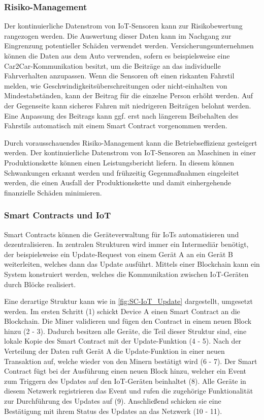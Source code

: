 \subsubsection{Risiko-Management}
\label{sec:Risk_Management}
Der kontinuierliche Datenstrom von IoT-Sensoren kann zur Risikobewertung rangezogen werden.
Die Auswertung dieser Daten kann im Nachgang zur Eingrenzung potentieller Schäden 
verwendet werden.
Versicherungsunternehmen können die Daten aus dem Auto verwenden, sofern es beispielsweise
eine Car2Car-Kommunikation besitzt, um die Beiträge an das individuelle Fahrverhalten
anzupassen. 
Wenn die Sensoren oft einen riskanten Fahrstil melden, wie Geschwindigkeitsüberschreitungen oder 
nicht-einhalten von Mindestabständen, kann der Beitrag für die einzelne Person erhöht werden. Auf der 
Gegenseite kann sicheres Fahren mit niedrigeren Beiträgen belohnt werden.
\cite[p.~169f]{chowdhary2025smart}
Eine Anpassung des Beitrags kann ggf. erst nach längerem Beibehalten des Fahrstils automatisch mit einem 
Smart Contract vorgenommen werden.

Durch vorausschauendes Risiko-Management kann die Betriebseffizienz gesteigert werden.
Der kontinuierliche Datenstrom von IoT-Sensoren an Maschinen in einer Produktionskette können einen
Leistungsbericht liefern. In diesem können Schwankungen erkannt werden und frühzeitig Gegenmaßnahmen 
eingeleitet werden, die einen Ausfall der Produktionskette und damit einhergehende finanzielle Schäden 
minimieren.
\cite[p.~169]{chowdhary2025smart}





\subsubsection{Smart Contracts und IoT}
Smart Contracts können die Geräteverwaltung für IoTs automatisieren und dezentralisieren. 
In zentralen Strukturen wird immer ein Intermediär benötigt, der beispielsweise ein Update-Request von einem
Gerät A an ein Gerät B weiterleiten, welches dann das Update ausführt.
Mittels einer Blockchain kann ein System konstruiert werden, welches die Kommunikation zwischen IoT-Geräten
durch Blöcke realisiert.

Eine derartige Struktur kann wie in \autoref{fig:SC-IoT_Update} dargestellt, umgesetzt werden.
Im ersten Schritt (1) schickt Device A einen Smart Contract an die Blockchain. Die Miner validieren 
und fügen den Contract in einem neuen Block hinzu (2 - 3). Dadurch besitzen alle Geräte, die Teil dieser 
Struktur sind, eine lokale Kopie des Smart Contract mit der Update-Funktion (4 - 5).
Nach der Verteilung der Daten ruft Gerät A die Update-Funktion in einer neuen Transaktion auf, welche 
wieder von den Minern bestätigt wird (6 - 7). 
Der Smart Contract fügt bei der Ausführung einen neuen Block hinzu, welcher ein Event zum
Triggern des Updates auf den IoT-Geräten beinhaltet (8). 
Alle Geräte in diesem Netzwerk registrieren das Event und rufen die zugehörige Funktionalität zur Durchführung
des Updates auf (9). Anschließend schicken sie eine Bestätigung mit ihrem Status des Updates an das Netzwerk (10 - 11).

